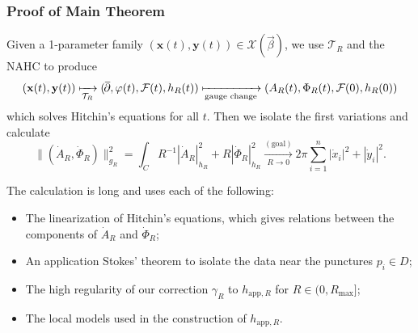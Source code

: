 \documentclass[aspectratio=1610,10pt]{beamer}
\theoremstyle{definition}
\theoremstyle{named}
\renewcommand{\bar}[1]{\overline{\hspace{-1pt}{#1}\hspace{-.2pt}}}
\DeclareMathOperator{\delbar}{\bar\partial}
\newcommand{\bx}{\mathbf{x}}
\newcommand{\by}{\mathbf{y}}
\begin{document}
\begin{frame}
    \frametitle{Proof of Main Theorem}
    Given a 1-parameter family $(\bx(t),\by(t))\in\mathcal X(\vec\beta)$, we use $\mathcal T_R$ and the NAHC to produce
    \begin{align*}
        (\bx(t),\by(t))
            \xmapsto[\mathcal T_R]{}(\delbar,\varphi(t),\mathcal F(t),h_R(t))
            \xmapsto[\text{gauge change}]{}(A_R(t),\Phi_R(t),\mathcal F(0),h_R(0))
    \end{align*}
    which solves Hitchin's equations for all $t$.
    \vfill
    Then we isolate the first variations and calculate
        $$\|(\dot A_R,\dot\Phi_R)\|_{g_R}^2=\int_C R^{-1}|\dot A_R|_{h_R}^2+R|\dot\Phi_R|_{h_R}^2\xrightarrow[R\to0]{\mathrm{(goal)}}2\pi\sum_{i=1}^n|\dot x_i|^2+|\dot y_i|^2.$$
    
    \pause
    The calculation is long and uses each of the following:
    \begin{itemize}
        \item The linearization of Hitchin's equations, which gives relations between the components of $\dot A_R$ and $\dot\Phi_R$;
        \item An application Stokes' theorem to isolate the data near the punctures $p_i\in D$;
        \item The high regularity of our correction $\gamma_R$ to $h_{\mathrm{app},R}$ for $R\in(0,R_{\max}]$;
        \item The local models used in the construction of $h_{\mathrm{app},R}$.
    \end{itemize}
\end{frame}
\end{document}

